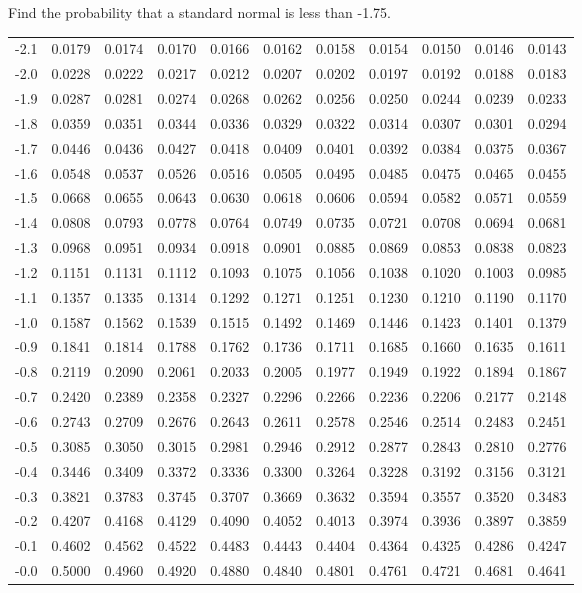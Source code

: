 \begin{frame}{\small Find the probability that a standard normal is less than -1.75.}
{\begin{tabular}{l|llllllllll}
-2.1 & 0.0179 & 0.0174 & 0.0170 & 0.0166 & 0.0162 & 0.0158 & 0.0154 & 0.0150 & 0.0146 & 0.0143 \\ 
-2.0 & 0.0228 & 0.0222 & 0.0217 & 0.0212 & 0.0207 & 0.0202 & 0.0197 & 0.0192 & 0.0188 & 0.0183 \\ 
-1.9 & 0.0287 & 0.0281 & 0.0274 & 0.0268 & 0.0262 & 0.0256 & 0.0250 & 0.0244 & 0.0239 & 0.0233 \\ 
-1.8 & 0.0359 & 0.0351 & 0.0344 & 0.0336 & 0.0329 & 0.0322 & 0.0314 & 0.0307 & 0.0301 & 0.0294 \\ 
\rowcolor{light-red} -1.7 & 0.0446 & 0.0436 & 0.0427 & 0.0418 & 0.0409 & 0.0401 & 0.0392 & 0.0384 & 0.0375 & 0.0367 \\ 
-1.6 & 0.0548 & 0.0537 & 0.0526 & 0.0516 & 0.0505 & 0.0495 & 0.0485 & 0.0475 & 0.0465 & 0.0455 \\ 
-1.5 & 0.0668 & 0.0655 & 0.0643 & 0.0630 & 0.0618 & 0.0606 & 0.0594 & 0.0582 & 0.0571 & 0.0559 \\ 
-1.4 & 0.0808 & 0.0793 & 0.0778 & 0.0764 & 0.0749 & 0.0735 & 0.0721 & 0.0708 & 0.0694 & 0.0681 \\ 
-1.3 & 0.0968 & 0.0951 & 0.0934 & 0.0918 & 0.0901 & 0.0885 & 0.0869 & 0.0853 & 0.0838 & 0.0823 \\ 
-1.2 & 0.1151 & 0.1131 & 0.1112 & 0.1093 & 0.1075 & 0.1056 & 0.1038 & 0.1020 & 0.1003 & 0.0985 \\ 
-1.1 & 0.1357 & 0.1335 & 0.1314 & 0.1292 & 0.1271 & 0.1251 & 0.1230 & 0.1210 & 0.1190 & 0.1170 \\ 
-1.0 & 0.1587 & 0.1562 & 0.1539 & 0.1515 & 0.1492 & 0.1469 & 0.1446 & 0.1423 & 0.1401 & 0.1379 \\ 
-0.9 & 0.1841 & 0.1814 & 0.1788 & 0.1762 & 0.1736 & 0.1711 & 0.1685 & 0.1660 & 0.1635 & 0.1611 \\ 
-0.8 & 0.2119 & 0.2090 & 0.2061 & 0.2033 & 0.2005 & 0.1977 & 0.1949 & 0.1922 & 0.1894 & 0.1867 \\ 
-0.7 & 0.2420 & 0.2389 & 0.2358 & 0.2327 & 0.2296 & 0.2266 & 0.2236 & 0.2206 & 0.2177 & 0.2148 \\ 
-0.6 & 0.2743 & 0.2709 & 0.2676 & 0.2643 & 0.2611 & 0.2578 & 0.2546 & 0.2514 & 0.2483 & 0.2451 \\ 
-0.5 & 0.3085 & 0.3050 & 0.3015 & 0.2981 & 0.2946 & 0.2912 & 0.2877 & 0.2843 & 0.2810 & 0.2776 \\ 
-0.4 & 0.3446 & 0.3409 & 0.3372 & 0.3336 & 0.3300 & 0.3264 & 0.3228 & 0.3192 & 0.3156 & 0.3121 \\ 
-0.3 & 0.3821 & 0.3783 & 0.3745 & 0.3707 & 0.3669 & 0.3632 & 0.3594 & 0.3557 & 0.3520 & 0.3483 \\ 
-0.2 & 0.4207 & 0.4168 & 0.4129 & 0.4090 & 0.4052 & 0.4013 & 0.3974 & 0.3936 & 0.3897 & 0.3859 \\ 
-0.1 & 0.4602 & 0.4562 & 0.4522 & 0.4483 & 0.4443 & 0.4404 & 0.4364 & 0.4325 & 0.4286 & 0.4247 \\ 
-0.0 & 0.5000 & 0.4960 & 0.4920 & 0.4880 & 0.4840 & 0.4801 & 0.4761 & 0.4721 & 0.4681 & 0.4641 
\end{tabular}


}


\end{frame}

